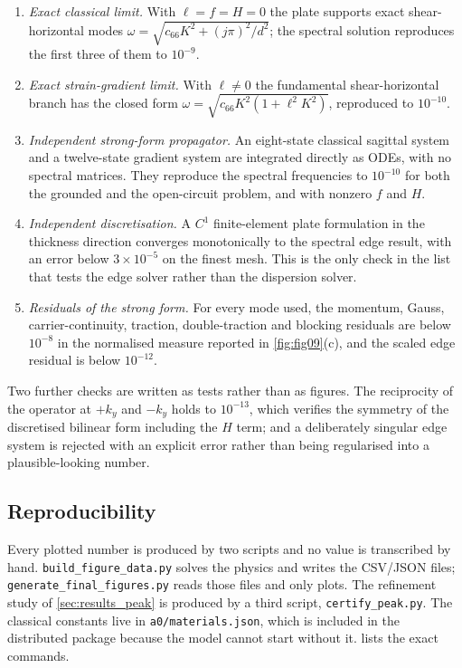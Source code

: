 \begin{enumerate}
\item \emph{Exact classical limit.}  With $\ell=f=H=0$ the plate supports
exact shear-horizontal modes $\omega=\sqrt{c_{66}K^2+(j\pi)^2/d^2}$; the spectral
solution reproduces the first three of them to $10^{-9}$.
\item \emph{Exact strain-gradient limit.}  With $\ell\neq0$ the fundamental
shear-horizontal branch has the closed form
$\omega=\sqrt{c_{66}K^2(1+\ell^2K^2)}$, reproduced to $10^{-10}$.
\item \emph{Independent strong-form propagator.}  An eight-state classical
sagittal system and a twelve-state gradient system are integrated directly as
ODEs, with no spectral matrices.  They reproduce the spectral frequencies to
$10^{-10}$ for both the grounded and the open-circuit problem, and with
nonzero $f$ and $H$.
\item \emph{Independent discretisation.}  A $C^1$ finite-element plate
formulation in the thickness direction converges monotonically to the spectral
edge result, with an error below $3\times10^{-5}$ on the finest mesh.  This is
the only check in the list that tests the edge solver rather than the
dispersion solver.
\item \emph{Residuals of the strong form.}  For every mode used, the momentum,
Gauss, carrier-continuity, traction, double-traction and blocking residuals are
below $10^{-8}$ in the normalised measure reported in
\cref{fig:fig09}(c), and the scaled edge residual is below $10^{-12}$.
\end{enumerate}

Two further checks are written as tests rather than as figures.  The
reciprocity of the operator at $+k_y$ and $-k_y$ holds to $10^{-13}$, which
verifies the symmetry of the discretised bilinear form including the $H$ term;
and a deliberately singular edge system is rejected with an explicit error
rather than being regularised into a plausible-looking number.

\subsection{Reproducibility}
\label{sec:numerics_repro}

Every plotted number is produced by two scripts and no value is transcribed by
hand.  \texttt{build\_figure\_data.py} solves the physics and writes the
CSV/JSON files; \texttt{generate\_final\_figures.py} reads those files and only
plots.  The refinement study of \cref{sec:results_peak} is produced by a third
script, \texttt{certify\_peak.py}.  The classical constants live in
\texttt{a0/materials.json}, which is included in the distributed package
because the model cannot start without it.   lists the exact
commands.
